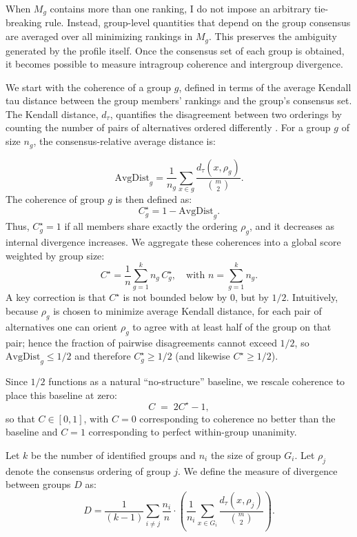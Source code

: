 \documentclass[12pt]{article}
\begin{document}
When \(M_g\) contains more than one ranking, I do not impose an arbitrary tie-breaking rule. Instead, group-level quantities that depend on the group consensus are averaged over all minimizing rankings in \(M_g\). This preserves the ambiguity generated by the profile itself. Once the consensus set of each group is obtained, it becomes possible to measure intragroup coherence and intergroup divergence.

We start with the coherence of a group \(g\), defined in terms of the average Kendall tau distance between the group members' rankings and the group's consensus set. The Kendall distance, \(d_{\tau}\), quantifies the disagreement between two orderings by counting the number of pairs of alternatives ordered differently \parencite{zwicker2016introduction}. For a group \(g\) of size \(n_g\), the consensus-relative average distance is:

\[
\text{AvgDist}_g = \frac{1}{n_g}\sum_{x \in g} \frac{d_{\tau}(x, \rho_g)}{\binom{m}{2}}.
\]
The coherence of group \( g \) is then defined as:
\[
C_g^{\star} = 1 - \text{AvgDist}_g.
\]
Thus, \( C_g^{\star} = 1 \) if all members share exactly the ordering \( \rho_g \), and it decreases as internal divergence increases. We aggregate these coherences into a global score weighted by group size:
\[
C^{\star} = \frac{1}{n} \sum_{g=1}^{k} n_g\,C_g^{\star}, \quad\text{with } n = \sum_{g=1}^{k} n_g.
\]
A key correction is that \(C^{\star}\) is not bounded below by \(0\), but by \(1/2\). Intuitively, because \(\rho_g\) is chosen to minimize average Kendall distance, for each pair of alternatives one can orient \(\rho_g\) to agree with at least half of the group on that pair; hence the fraction of pairwise disagreements cannot exceed \(1/2\), so \(\text{AvgDist}_g \le 1/2\) and therefore \(C_g^{\star} \ge 1/2\) (and likewise \(C^{\star} \ge 1/2\)).

Since \(1/2\) functions as a natural ``no-structure'' baseline, we rescale coherence to place this baseline at zero:
\[
C \;=\; 2C^{\star}-1,
\]
so that \(C \in [0,1]\), with \(C=0\) corresponding to coherence no better than the baseline and \(C=1\) corresponding to perfect within-group unanimity.


Let \( k \) be the number of identified groups and \( n_i \) the size of group \( G_i \). Let \( \rho_j \) denote the consensus ordering of group \( j \). We define the measure of divergence between groups \( D \) as:
\[
D = \frac{1}{(k-1)} \sum_{i \neq j} \frac{n_i}{n} \cdot \left(\frac{1}{n_i}\sum_{x \in G_i} \frac{d_{\tau}(x, \rho_j)}{\binom{m}{2}}\right).
\]
\end{document}

